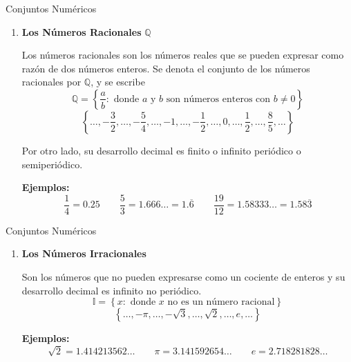 \documentclass[10pt]{beamer}
\begin{document}
	\begin{frame}{Conjuntos Numéricos}
		\begin{block}{}
			\begin{enumerate}
				\item[3.] \textbf{Los Números Racionales} \(\mathbb{Q}\)
				
				Los números racionales son los números reales que se pueden expresar como razón de dos números enteros. Se denota el conjunto de los números racionales por \(\mathbb{Q}\), y se escribe
				\[
				\mathbb{Q}=
				\left\{
				\dfrac{a}{b}:\text{ donde }a \text{ y } b \text{ son números enteros con } b\neq 0
				\right\}
				\]
				\[
				\left\{
				\ldots,-\frac{3}{2},\ldots,-\frac{5}{4},\ldots,-1,\ldots,-\frac{1}{2},\ldots,0,\ldots,\frac{1}{2},\ldots,\frac{8}{5},\ldots
				\right\}
				\]
				
				Por otro lado, su desarrollo decimal es finito o infinito periódico o semiperiódico.
				
				\textbf{Ejemplos:}
				\[
				\frac{1}{4}=0.25
				\qquad
				\frac{5}{3}=1.666\ldots = 1.\overline{6}
				\qquad
				\frac{19}{12}=1.58333\ldots = 1.58\overline{3}
				\]
			\end{enumerate}
		\end{block}
	\end{frame}
	
	\begin{frame}{Conjuntos Numéricos}
		\begin{block}{}
			\begin{enumerate}
				\item[4.] \textbf{Los Números Irracionales}
				
				Son los números que no pueden expresarse como un cociente de enteros y su desarrollo decimal es infinito no periódico.
				\[
				\mathbb{I}=
				\left\{
				x:\text{ donde }x\text{ no es un número racional}
				\right\}
				\]
				\[
				\left\{
				\ldots,-\pi,\ldots,-\sqrt{3},\ldots,\sqrt{2},\ldots,e,\ldots
				\right\}
				\]
				
				\textbf{Ejemplos:}
				\[
				\sqrt{2}=1.414213562\ldots
				\qquad
				\pi=3.141592654\ldots
				\qquad
				e=2.718281828\ldots
				\]
			\end{enumerate}
		\end{block}
	\end{frame}
	
\end{document}
